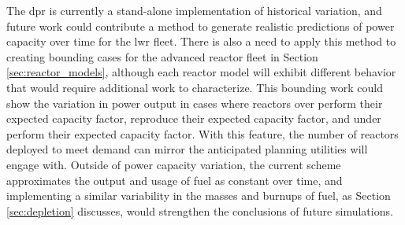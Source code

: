 The \gls{dpr} is currently a stand-alone implementation of historical variation, and future work could contribute a method to generate realistic predictions of power capacity over time for the \gls{lwr} fleet. There is also a need to apply this method to creating bounding cases for the advanced reactor fleet in Section \ref{sec:reactor_models}, although each reactor model will exhibit different behavior that would require additional work to characterize. This bounding work could show the variation in power output in cases where reactors over perform their expected capacity factor, reproduce their expected capacity factor, and under perform their expected capacity factor. With this feature, the number of reactors deployed to meet demand can mirror the anticipated planning utilities will engage with. Outside of power capacity variation, the current scheme approximates the output and usage of fuel as constant over time, and implementing a similar variability in the masses and burnups of fuel, as Section \ref{sec:depletion} discusses, would strengthen the conclusions of future \cyclus simulations.


